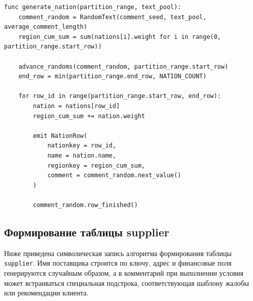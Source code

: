 \begin{lstlisting}[caption={Формирование таблицы nation}]
func generate_nation(partition_range, text_pool):
    comment_random = RandomText(comment_seed, text_pool, average_comment_length)
    region_cum_sum = sum(nations[i].weight for i in range(0, partition_range.start_row))

    advance_randoms(comment_random, partition_range.start_row)
    end_row = min(partition_range.end_row, NATION_COUNT)

    for row_id in range(partition_range.start_row, end_row):
        nation = nations[row_id]
        region_cum_sum += nation.weight

        emit NationRow(
            nationkey = row_id,
            name = nation.name,
            regionkey = region_cum_sum,
            comment = comment_random.next_value()
        )

        comment_random.row_finished()
\end{lstlisting}

\subsection{Формирование таблицы supplier}

Ниже приведена символическая запись алгоритма формирования таблицы
\texttt{supplier}. Имя поставщика строится по ключу, адрес и финансовые поля
генерируются случайным образом, а в комментарий при выполнении условия может
встраиваться специальная подстрока, соответствующая шаблону жалобы или
рекомендации клиента.

